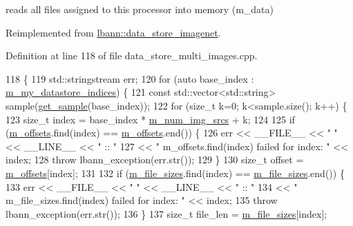 reads all files assigned to this processor into memory (m\+\_\+data) 



Reimplemented from \hyperlink{classlbann_1_1data__store__imagenet_a70cfd8f529aad8d66993000da7350ec5}{lbann\+::data\+\_\+store\+\_\+imagenet}.



Definition at line 118 of file data\+\_\+store\+\_\+multi\+\_\+images.\+cpp.


\begin{DoxyCode}
118                                          \{
119   std::stringstream err;
120   \textcolor{keywordflow}{for} (\textcolor{keyword}{auto} base\_index : \hyperlink{classlbann_1_1generic__data__store_abd38f8d8aab0648959e09d011abfe20a}{m\_my\_datastore\_indices}) \{
121     \textcolor{keyword}{const} std::vector<std::string> sample(\hyperlink{classlbann_1_1data__store__multi__images_a39108690484fe407efafefe6a4b0947b}{get\_sample}(base\_index));
122     \textcolor{keywordflow}{for} (\textcolor{keywordtype}{size\_t} k=0; k<sample.size(); k++) \{
123       \textcolor{keywordtype}{size\_t} index = base\_index * \hyperlink{classlbann_1_1data__store__image_a2f660053e7621a9cc70a7c4eef53c9cc}{m\_num\_img\_srcs} + k;
124 
125       \textcolor{keywordflow}{if} (\hyperlink{classlbann_1_1data__store__image_ae5a9ba5fb1bf4d3147743012b8099038}{m\_offsets}.find(index) == \hyperlink{classlbann_1_1data__store__image_ae5a9ba5fb1bf4d3147743012b8099038}{m\_offsets}.end()) \{
126         err << \_\_FILE\_\_ << \textcolor{stringliteral}{" "} << \_\_LINE\_\_ << \textcolor{stringliteral}{" :: "} 
127             << \textcolor{stringliteral}{" m\_offsets.find(index) failed for index: "} << index;
128         \textcolor{keywordflow}{throw} lbann\_exception(err.str());
129       \}
130       \textcolor{keywordtype}{size\_t} offset = \hyperlink{classlbann_1_1data__store__image_ae5a9ba5fb1bf4d3147743012b8099038}{m\_offsets}[index];
131 
132       \textcolor{keywordflow}{if} (\hyperlink{classlbann_1_1data__store__image_a1903176a4b305fd42617ea1cb6d997ae}{m\_file\_sizes}.find(index) == \hyperlink{classlbann_1_1data__store__image_a1903176a4b305fd42617ea1cb6d997ae}{m\_file\_sizes}.end()) \{
133         err << \_\_FILE\_\_ << \textcolor{stringliteral}{" "} << \_\_LINE\_\_ << \textcolor{stringliteral}{" :: "} 
134             << \textcolor{stringliteral}{" m\_file\_sizes.find(index) failed for index: "} << index;
135         \textcolor{keywordflow}{throw} lbann\_exception(err.str());
136       \}
137       \textcolor{keywordtype}{size\_t} file\_len = \hyperlink{classlbann_1_1data__store__image_a1903176a4b305fd42617ea1cb6d997ae}{m\_file\_sizes}[index];

\end{DoxyCode}
